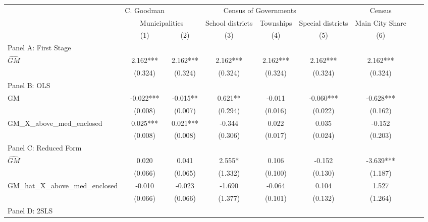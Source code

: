  \begin{tabular}{l*{8}{c}} \toprule
&\multicolumn{1}{c}{C. Goodman}&\multicolumn{4}{c}{Census of Governments}&\multicolumn{1}{c}{Census}\\\cmidrule(lr){2-2}\cmidrule(lr){3-6}\cmidrule(lr){7-7}
&\multicolumn{2}{c}{Municipalities}&\multicolumn{1}{c}{School districts}&\multicolumn{1}{c}{Townships}&\multicolumn{1}{c}{Special districts}&\multicolumn{1}{c}{Main City Share}\\\cmidrule(lr){2-3}\cmidrule(lr){4-6}\cmidrule(lr){7-7}
&\multicolumn{1}{c}{(1)}&\multicolumn{1}{c}{(2)}&\multicolumn{1}{c}{(3)}&\multicolumn{1}{c}{(4)}&\multicolumn{1}{c}{(5)}&\multicolumn{1}{c}{(6)}\\
\cmidrule(lr){1-7}
\multicolumn{6}{l}{Panel A: First Stage}\\
\cmidrule(lr){1-7}
$\widehat{GM}$  &    2.162***&    2.162***&    2.162***&    2.162***&    2.162***&    2.162***\\
                &  (0.324)   &  (0.324)   &  (0.324)   &  (0.324)   &  (0.324)   &  (0.324)   \\
\cmidrule(lr){1-7}
\multicolumn{6}{l}{Panel B: OLS}\\
\cmidrule(lr){1-7}
GM              &   -0.022***&   -0.015** &    0.621** &   -0.011   &   -0.060***&   -0.628***\\
                &  (0.008)   &  (0.007)   &  (0.294)   &  (0.016)   &  (0.022)   &  (0.162)   \\
\addlinespace
GM\_X\_above\_med\_enclosed&    0.025***&    0.021***&   -0.344   &    0.022   &    0.035   &   -0.152   \\
                &  (0.008)   &  (0.008)   &  (0.306)   &  (0.017)   &  (0.024)   &  (0.203)   \\
\cmidrule(lr){1-7}
\multicolumn{6}{l}{Panel C: Reduced Form}\\
\cmidrule(lr){1-7}
$\widehat{GM}$  &    0.020   &    0.041   &    2.555*  &    0.106   &   -0.152   &   -3.639***\\
                &  (0.066)   &  (0.065)   &  (1.332)   &  (0.100)   &  (0.130)   &  (1.187)   \\
\addlinespace
GM\_hat\_X\_above\_med\_enclosed&   -0.010   &   -0.023   &   -1.690   &   -0.064   &    0.104   &    1.527   \\
                &  (0.066)   &  (0.066)   &  (1.377)   &  (0.101)   &  (0.132)   &  (1.264)   \\
\cmidrule(lr){1-7}
\multicolumn{6}{l}{Panel D: 2SLS}\\

\end{tabular}
